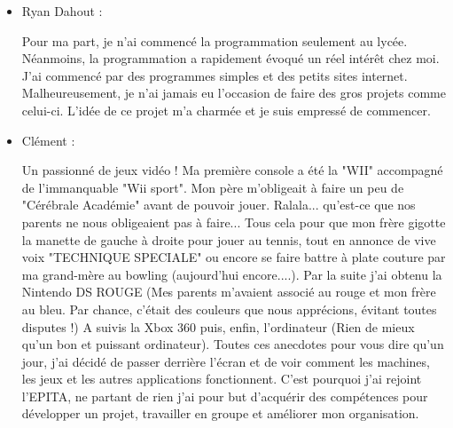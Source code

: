 \documentclass[french, 12pt]{article}
\begin{document}
\begin{flushleft}
\begin{itemize}
    \vspace{0.75cm}
    \newpage
    \item Ryan Dahout : \newline

    Pour ma part, je n’ai commencé la programmation seulement au lycée. Néanmoins, la programmation a rapidement évoqué un réel intérêt chez moi. J’ai commencé par des programmes simples et des petits sites internet. Malheureusement, je n’ai jamais eu l’occasion de faire des gros projets comme celui-ci. L’idée de ce projet m’a charmée et je suis empressé de commencer.

    \vspace{0.75cm}

    \item Clément : \newline
    
    Un passionné de jeux vidéo ! Ma première console a été la "WII" accompagné de l'immanquable "Wii sport". Mon père m'obligeait à faire un peu de "Cérébrale Académie" avant de pouvoir jouer. Ralala... qu'est-ce que nos parents ne nous obligeaient pas à faire... Tous cela pour que mon frère gigotte la manette de gauche à droite pour jouer au tennis, tout en annonce de vive voix "TECHNIQUE SPECIALE" ou encore se faire battre à plate couture par ma grand-mère au bowling (aujourd'hui encore....). Par la suite j'ai obtenu la Nintendo DS ROUGE (Mes parents m'avaient associé au rouge et mon frère au bleu. Par chance, c'était des couleurs que nous apprécions, évitant toutes disputes !)  A suivis la Xbox 360 puis, enfin,  l'ordinateur (Rien de mieux qu'un bon et puissant ordinateur). Toutes ces anecdotes pour vous dire qu'un jour, j'ai décidé de passer derrière l'écran et de voir comment les machines, les jeux et les autres applications fonctionnent. C'est pourquoi j'ai rejoint l'EPITA, ne partant de rien j'ai pour but d'acquérir des compétences pour développer un projet, travailler en groupe et améliorer mon organisation.
    \end{itemize}
    
    \end{flushleft}
    \newpage
    
    \color{black}
\end{document}
